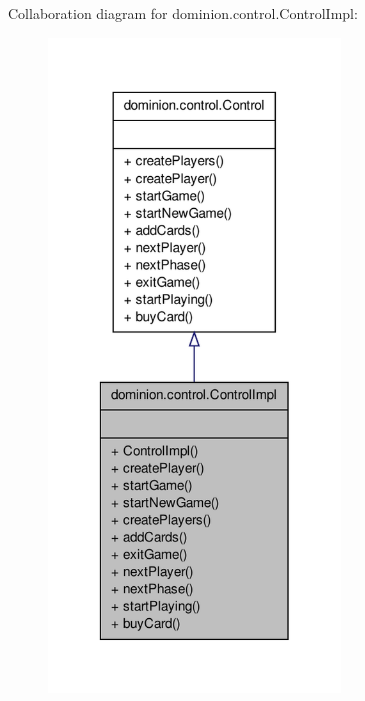 \-Collaboration diagram for dominion.\-control.\-Control\-Impl\-:
\nopagebreak
\begin{figure}[H]
\begin{center}
\leavevmode
\includegraphics[width=220pt]{classdominion_1_1control_1_1ControlImpl__coll__graph}
\end{center}
\end{figure}
